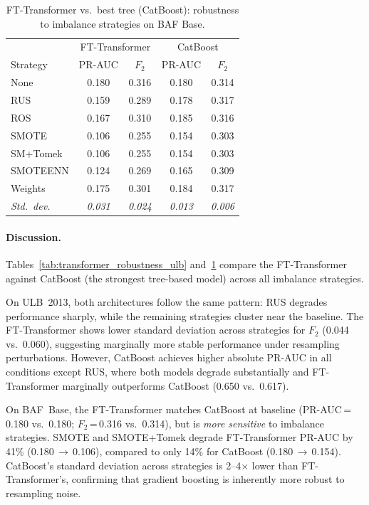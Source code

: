 \begin{table}[ht!]
\centering
\caption{FT-Transformer vs.\ best tree (CatBoost): robustness to imbalance strategies on BAF Base.}
\label{tab:transformer_robustness_baf}
\begin{tabular}{l cc cc}
\toprule
& \multicolumn{2}{c}{FT-Transformer} & \multicolumn{2}{c}{CatBoost} \\
Strategy & PR-AUC & $F_2$ & PR-AUC & $F_2$ \\
\midrule
None      & 0.180 & 0.316 & 0.180 & 0.314 \\
RUS       & 0.159 & 0.289 & 0.178 & 0.317 \\
ROS       & 0.167 & 0.310 & 0.185 & 0.316 \\
SMOTE     & 0.106 & 0.255 & 0.154 & 0.303 \\
SM+Tomek  & 0.106 & 0.255 & 0.154 & 0.303 \\
SMOTEENN  & 0.124 & 0.269 & 0.165 & 0.309 \\
Weights   & 0.175 & 0.301 & 0.184 & 0.317 \\
\midrule
\textit{Std.\ dev.} & \textit{0.031} & \textit{0.024} & \textit{0.013} & \textit{0.006} \\
\bottomrule
\end{tabular}
\end{table}

\paragraph{Discussion.}
Tables~\ref{tab:transformer_robustness_ulb} and~\ref{tab:transformer_robustness_baf} compare the FT-Transformer against CatBoost (the strongest tree-based model) across all imbalance strategies.

On ULB~2013, both architectures follow the same pattern: RUS degrades performance sharply, while the remaining strategies cluster near the baseline.
The FT-Transformer shows lower standard deviation across strategies for $F_2$ (0.044 vs.\ 0.060), suggesting marginally more stable performance under resampling perturbations.
However, CatBoost achieves higher absolute PR-AUC in all conditions except RUS, where both models degrade substantially and FT-Transformer marginally outperforms CatBoost (0.650 vs.\ 0.617).

On BAF~Base, the FT-Transformer matches CatBoost at baseline (PR-AUC\,=\,0.180 vs.\ 0.180; $F_2$\,=\,0.316 vs.\ 0.314), but is \emph{more sensitive} to imbalance strategies.
SMOTE and SMOTE+Tomek degrade FT-Transformer PR-AUC by 41\% (0.180\,$\to$\,0.106), compared to only 14\% for CatBoost (0.180\,$\to$\,0.154).
CatBoost's standard deviation across strategies is 2--4$\times$ lower than FT-Transformer's, confirming that gradient boosting is inherently more robust to resampling noise.

